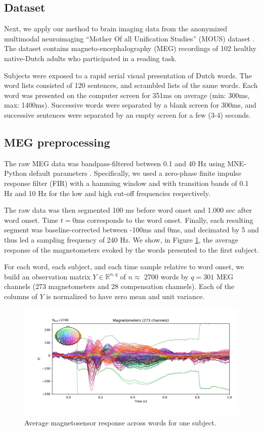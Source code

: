 \subsection{Dataset}

Next, we apply our method to brain imaging data from the anonymized multimodal
neuroimaging ``Mother Of all Unification Studies'' (MOUS) dataset
\cite{schoffelen2019204}.  The dataset contains magneto-encephalography (MEG)
recordings of 102 healthy native-Dutch adults who participated in a reading
task.

Subjects were exposed to a rapid serial visual presentation of Dutch words. The
word lists consisted of 120 sentences, and scrambled lists of the same words.
Each word was presented on the computer screen for 351ms on average (min: 300ms,
max: 1400ms).  Successive words were separated by a blank screen for 300ms, and
successive sentences were separated by an empty screen for a few (3-4) seconds.

\subsection{MEG preprocessing}

The raw MEG data was bandpass-filtered between 0.1 and 40 Hz using MNE-Python
default parameters \cite{mne}. Specifically, we used a zero-phase finite impulse
response filter (FIR) with a hamming window and with transition bands of 0.1 Hz
and 10 Hz for the low and high cut-off frequencies respectively.

The raw data was then segmented 100 ms before word onset and 1.000 sec after
word onset. Time $t=0$ms corresponds to the word onset. Finally, each resulting
segment was baseline-corrected between -100ms and 0ms, and decimated by 5 and
thus led a sampling frequency of 240 Hz. We show, in Figure \ref{fig:megavg},
the average response of the magnetometers evoked by the words presented to the
first subject.

For each word, each subject, and each time sample relative to word onset, we
build an observation matrix $Y \in \mathbb{R}^{n, q}$ of $n\approx$ 2700 words
by $q=301$ MEG channels (273 magnetometers and 28 compensation channels). Each
of the columns of $Y$ is normalized to have zero mean and unit variance.

\begin{figure} \centering \includegraphics[width=\textwidth, trim=1.5cm 1cm
0.5cm 0cm, clip=True]{figure_meg.pdf} \caption{Average magnetosensor response
across words for one subject.} \label{fig:megavg} \end{figure}

